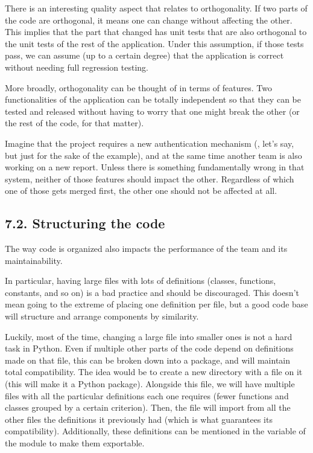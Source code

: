 \documentclass[a4paper,10pt,english]{sphinxmanual}
\begin{document}
There is an interesting quality aspect that relates to orthogonality. If two parts of the code are orthogonal,
it means one can change without affecting the other. This implies that the part that changed has unit tests
that are also orthogonal to the unit tests of the rest of the application. Under this assumption, if those
tests pass, we can assume (up to a certain degree) that the application is correct without needing full
regression testing.

More broadly, orthogonality can be thought of in terms of features. Two functionalities of the application can
be totally independent so that they can be tested and released without having to worry that one might break
the other (or the rest of the code, for that matter).

Imagine that the project requires a new authentication mechanism (, let’s say, but just for the sake
of the example), and at the same time another team is also working on a new report. Unless there is something
fundamentally wrong in that system, neither of those features should impact the other. Regardless of which one
of those gets merged first, the other one should not be affected at all.


\subsection{7.2. Structuring the code}
\label{\detokenize{chapters/3_general_traits/index:structuring-the-code}}
The way code is organized also impacts the performance of the team and its maintainability.

In particular, having large files with lots of definitions (classes, functions, constants, and so on) is a bad
practice and should be discouraged. This doesn’t mean going to the extreme of placing one definition per file,
but a good code base will structure and arrange components by similarity.

Luckily, most of the time, changing a large file into smaller ones is not a hard task in Python. Even if
multiple other parts of the code depend on definitions made on that file, this can be broken down into a
package, and will maintain total compatibility. The idea would be to create a new directory with a
 file on it (this will make it a Python package). Alongside this file, we will have multiple
files with all the particular definitions each one requires (fewer functions and classes grouped by a certain
criterion). Then, the  file will import from all the other files the definitions it previously
had (which is what guarantees its compatibility). Additionally, these definitions can be mentioned in the
 variable of the module to make them exportable.
\end{document}
